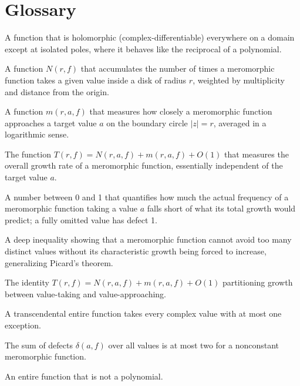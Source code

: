 \section*{Glossary}
\begin{description}[leftmargin=*,style=nextline,itemsep=0.3em]
\item[\textbf{Meromorphic function.}] A function that is holomorphic (complex-differentiable) everywhere on a domain except at isolated poles, where it behaves like the reciprocal of a polynomial.
\item[\textbf{Counting function.}] A function $N(r,f)$ that accumulates the number of times a meromorphic function takes a given value inside a disk of radius $r$, weighted by multiplicity and distance from the origin.
\item[\textbf{Proximity function.}] A function $m(r,a,f)$ that measures how closely a meromorphic function approaches a target value $a$ on the boundary circle $|z|=r$, averaged in a logarithmic sense.
\item[\textbf{Characteristic function.}] The function $T(r,f)=N(r,a,f)+m(r,a,f)+O(1)$ that measures the overall growth rate of a meromorphic function, essentially independent of the target value $a$.
\item[\textbf{Defect.}] A number between 0 and 1 that quantifies how much the actual frequency of a meromorphic function taking a value $a$ falls short of what its total growth would predict; a fully omitted value has defect 1.
\item[\textbf{Second fundamental theorem.}] A deep inequality showing that a meromorphic function cannot avoid too many distinct values without its characteristic growth being forced to increase, generalizing Picard's theorem.
\item[\textbf{First fundamental theorem.}] The identity $T(r,f)=N(r,a,f)+m(r,a,f)+O(1)$ partitioning growth between value-taking and value-approaching.
\item[\textbf{Picard theorem.}] A transcendental entire function takes every complex value with at most one exception.
\item[\textbf{Defect relation.}] The sum of defects $\delta(a,f)$ over all values is at most two for a nonconstant meromorphic function.
\item[\textbf{Transcendental function.}] An entire function that is not a polynomial.
\end{description}

